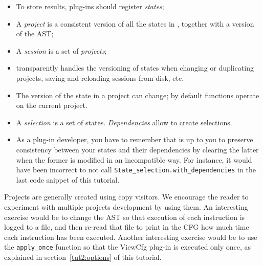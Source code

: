 \begin{itemize}
\item To store results, plug-ins should register \emph{states};
\item A \emph{project} is a consistent version of all the states in
  \framac, together with a version of the AST;
\item A \emph{session} is a set of \emph{projects};
\item \framac transparently handles the versioning of states when
  changing or duplicating projects, saving and reloading sessions from
  disk, etc.
\item The version of the state in a project can change; by default
  \framac functions operate on the current project.
\item A \emph{selection} is a set of states. \emph{Dependencies} allow
  to create selections.
\item As a plug-in developer, you have to remember that is up to you to preserve
  consistency between your states and their dependencies by clearing the latter
  when the former is modified in an incompatible way. For instance, it would
  have been incorrect to not call 
  \texttt{State\_selection.with\_dependencies}
   in the last code snippet of
  this tutorial.
\end{itemize}

Projects are generally created using copy visitors. We encourage the reader to
experiment with multiple projects development by using them. An interesting
exercise would be to change the AST so that execution of each instruction is
logged to a file, and then re-read that file to print in the CFG how much time
each instruction has been executed. Another interesting exercise would be
to use the \texttt{apply\_once} function so that the ViewCfg plug-in is executed
only once, as explained in section~\ref{tut2:options} of this tutorial.
